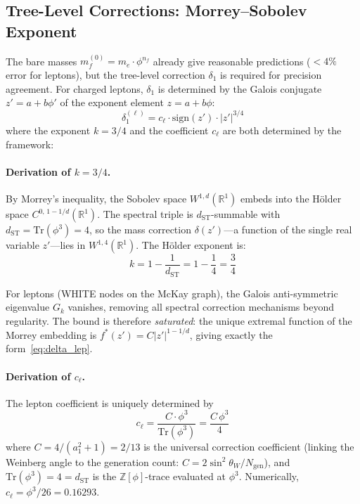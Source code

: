 \documentclass[12pt,a4paper]{article}
\theoremstyle{definition}
\begin{document}
\subsection{Tree-Level Corrections: Morrey--Sobolev Exponent}
\label{sec:corrections}

The bare masses $m_f^{(0)} = m_e \cdot \phi^{n_f}$ already give reasonable predictions ($< 4\%$ error for leptons), but the tree-level correction $\delta_1$ is required for precision agreement.  For charged leptons, $\delta_1$ is determined by the Galois conjugate $z' = a + b\phi'$ of the exponent element $z = a + b\phi$:
\begin{equation}
\boxed{\delta_1^{(\ell)} = c_\ell \cdot \mathrm{sign}(z') \cdot |z'|^{3/4}}
\label{eq:delta_lep}
\end{equation}
where the exponent $k = 3/4$ and the coefficient $c_\ell$ are both determined by the framework:

\paragraph{Derivation of $k = 3/4$.}  By Morrey's inequality, the Sobolev space $W^{1,d}(\mathbb{R}^1)$ embeds into the H\"older space $C^{0,\,1-1/d}(\mathbb{R}^1)$.  The spectral triple is $d_{\mathrm{ST}}$-summable with $d_{\mathrm{ST}} = \mathrm{Tr}(\phi^3) = 4$, so the mass correction $\delta(z')$---a function of the single real variable $z'$---lies in $W^{1,4}(\mathbb{R}^1)$.  The H\"older exponent is:
\begin{equation}
k = 1 - \frac{1}{d_{\mathrm{ST}}} = 1 - \frac{1}{4} = \frac{3}{4}
\label{eq:morrey}
\end{equation}

For leptons (WHITE nodes on the McKay graph), the Galois anti-symmetric eigenvalue $G_k$ vanishes, removing all spectral correction mechanisms beyond regularity.  The bound is therefore \emph{saturated}: the unique extremal function of the Morrey embedding is $f^*(z') = C|z'|^{1-1/d}$, giving exactly the form~\eqref{eq:delta_lep}.

\paragraph{Derivation of $c_\ell$.}  The lepton coefficient is uniquely determined by
\begin{equation}
\boxed{c_\ell = \frac{C \cdot \phi^3}{\mathrm{Tr}(\phi^3)} = \frac{C\,\phi^3}{4}}
\label{eq:c_ell}
\end{equation}
where $C = 4/(a_1^2 + 1) = 2/13$ is the universal correction coefficient (linking the Weinberg angle to the generation count: $C = 2\sin^2\theta_W/N_{\mathrm{gen}}$), and $\mathrm{Tr}(\phi^3) = 4 = d_{\mathrm{ST}}$ is the $\mathbb{Z}[\phi]$-trace evaluated at $\phi^3$.  Numerically, $c_\ell = \phi^3/26 = 0.16293$.
\end{document}
